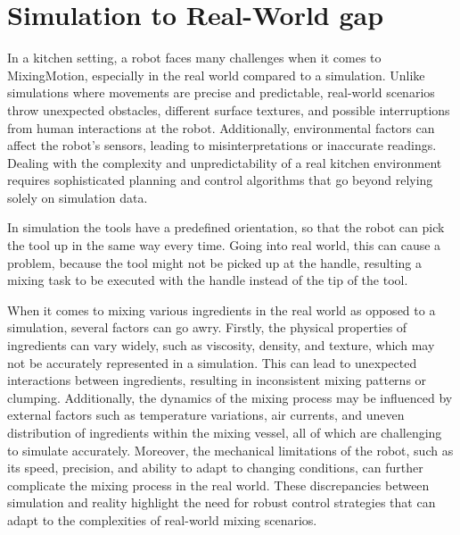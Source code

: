 \section{Simulation to Real-World gap}
\label{sec: simulation to real world gap}

In a kitchen setting, a robot faces many challenges when it comes to MixingMotion, especially in the real world compared to a simulation.
Unlike simulations where movements are precise and predictable, real-world scenarios throw unexpected obstacles, different surface textures, and possible interruptions from human interactions at the robot.
Additionally, environmental factors can affect the robot's sensors, leading to misinterpretations or inaccurate readings.
Dealing with the complexity and unpredictability of a real kitchen environment requires sophisticated planning and control algorithms that go beyond relying solely on simulation data.

In simulation the tools have a predefined orientation, so that the robot can pick the tool up in the same way every time.
Going into real world, this can cause a problem, because the tool might not be picked up at the handle, resulting
a mixing task to be executed with the handle instead of the tip of the tool.

When it comes to mixing various ingredients in the real world as opposed to a simulation, several factors can go awry. Firstly, the physical properties of ingredients can vary widely, such as viscosity, density, and texture, which may not be accurately represented in a simulation.
This can lead to unexpected interactions between ingredients, resulting in inconsistent mixing patterns or clumping. Additionally, the dynamics of the mixing process may be influenced by external factors such as temperature variations, air currents, and uneven distribution of ingredients within the mixing vessel, all of which are challenging to simulate accurately.
Moreover, the mechanical limitations of the robot, such as its speed, precision, and ability to adapt to changing conditions, can further complicate the mixing process in the real world.
These discrepancies between simulation and reality highlight the need for robust control strategies that can adapt to the complexities of real-world mixing scenarios.


